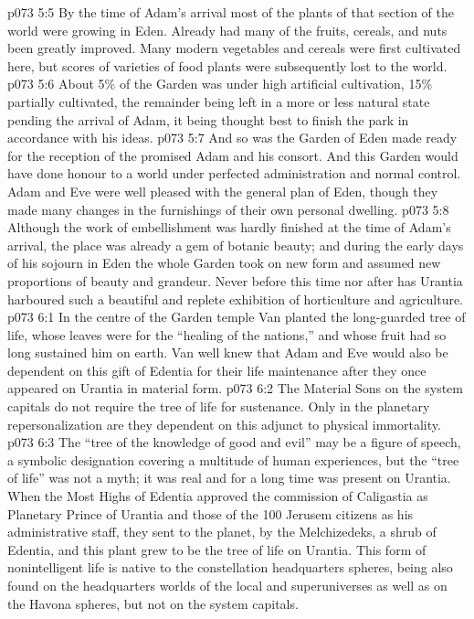 \vs p073 5:5 By the time of Adam’s arrival most of the plants of that section of the world were growing in Eden. Already had many of the fruits, cereals, and nuts been greatly improved. Many modern vegetables and cereals were first cultivated here, but scores of varieties of food plants were subsequently lost to the world.
\vs p073 5:6 About 5\% of the Garden was under high artificial cultivation, 15\% partially cultivated, the remainder being left in a more or less natural state pending the arrival of Adam, it being thought best to finish the park in accordance with his ideas.
\vs p073 5:7 And so was the Garden of Eden made ready for the reception of the promised Adam and his consort. And this Garden would have done honour to a world under perfected administration and normal control. Adam and Eve were well pleased with the general plan of Eden, though they made many changes in the furnishings of their own personal dwelling.
\vs p073 5:8 Although the work of embellishment was hardly finished at the time of Adam’s arrival, the place was already a gem of botanic beauty; and during the early days of his sojourn in Eden the whole Garden took on new form and assumed new proportions of beauty and grandeur. Never before this time nor after has Urantia harboured such a beautiful and replete exhibition of horticulture and agriculture.
\vs p073 6:1 In the centre of the Garden temple Van planted the long\hyp{}guarded tree of life, whose leaves were for the “healing of the nations,” and whose fruit had so long sustained him on earth. Van well knew that Adam and Eve would also be dependent on this gift of Edentia for their life maintenance after they once appeared on Urantia in material form.
\vs p073 6:2 The Material Sons on the system capitals do not require the tree of life for sustenance. Only in the planetary repersonalization are they dependent on this adjunct to physical immortality.
\vs p073 6:3 \pc The “tree of the knowledge of good and evil” may be a figure of speech, a symbolic designation covering a multitude of human experiences, but the “tree of life” was not a myth; it was real and for a long time was present on Urantia. When the Most Highs of Edentia approved the commission of Caligastia as Planetary Prince of Urantia and those of the 100 Jerusem citizens as his administrative staff, they sent to the planet, by the Melchizedeks, a shrub of Edentia, and this plant grew to be the tree of life on Urantia. This form of nonintelligent life is native to the constellation headquarters spheres, being also found on the headquarters worlds of the local and superuniverses as well as on the Havona spheres, but not on the system capitals.
